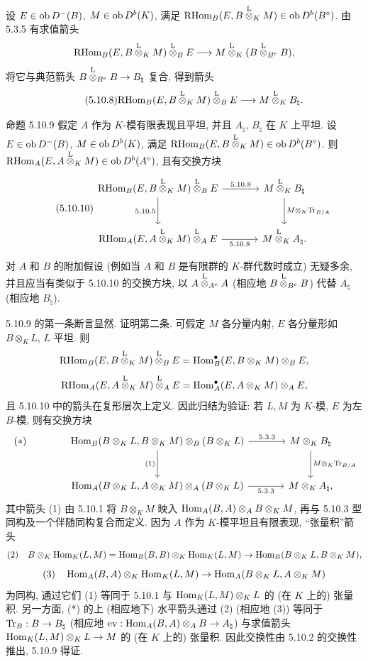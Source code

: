 设 $E\in\operatorname{ob} D^-(B)$, $M\in\operatorname{ob} D^b(K)$, 满足 $\mathrm{RHom}_B(E,B\overset{\mathrm L}{\otimes}_KM)\in\operatorname{ob} D^b(B^\circ)$. 由 5.3.5 有求值箭头
\[
\mathrm{RHom}_B(E,B\overset{\mathrm L}{\otimes}_KM)\overset{\mathrm L}{\otimes}_BE\longrightarrow M\overset{\mathrm L}{\otimes}_K(B\overset{\mathrm L}{\otimes}_{B^e}B),
\]
将它与典范箭头 $B\overset{\mathrm L}{\otimes}_{B^e}B\to B_\natural$ 复合, 得到箭头
\begin{equation}\tag{5.10.8}
\mathrm{RHom}_B(E,B\overset{\mathrm L}{\otimes}_KM)\overset{\mathrm L}{\otimes}_BE\longrightarrow M\overset{\mathrm L}{\otimes}_KB_\natural.
\end{equation}

\begin{statement}{命题 5.10.9}
假定 $A$ 作为 $K$-模有限表现且平坦, 并且 $A_\natural$, $B_\natural$ 在 $K$ 上平坦. 设 $E\in\operatorname{ob} D^-(B)$, $M\in\operatorname{ob} D^b(K)$, 满足 $\mathrm{RHom}_B(E,B\overset{\mathrm L}{\otimes}_KM)\in\operatorname{ob} D^b(B^\circ)$. 则 $\mathrm{RHom}_A(E,A\overset{\mathrm L}{\otimes}_KM)\in\operatorname{ob} D^b(A^\circ)$, 且有交换方块
\begin{equation}\tag{5.10.10}
\begin{tikzcd}[column sep=large,row sep=large]
\RHom_B(E,B\lten_KM)\lten_BE \arrow[r,"5.10.8"] \arrow[d,"5.10.5"'] & M\lten_KB_\natural \arrow[d,"M\otimes_K\Tr_{B/A}"]\\
\RHom_A(E,A\lten_KM)\lten_AE \arrow[r,"5.10.8"'] & M\lten_KA_\natural .
\end{tikzcd}
\end{equation}
\end{statement}

对 $A$ 和 $B$ 的附加假设 (例如当 $A$ 和 $B$ 是有限群的 $K$-群代数时成立) 无疑多余, 并且应当有类似于 5.10.10 的交换方块, 以 $A\overset{\mathrm L}{\otimes}_{A^e}A$ (相应地 $B\overset{\mathrm L}{\otimes}_{B^e}B$) 代替 $A_\natural$ (相应地 $B_\natural$).

5.10.9 的第一条断言显然. 证明第二条. 可假定 $M$ 各分量内射, $E$ 各分量形如 $B\otimes_KL$, $L$ 平坦. 则
\[
\mathrm{RHom}_B(E,B\overset{\mathrm L}{\otimes}_KM)\overset{\mathrm L}{\otimes}_BE=\operatorname{Hom}_B^\bullet(E,B\otimes_KM)\otimes_BE,
\]
\[
\mathrm{RHom}_A(E,A\overset{\mathrm L}{\otimes}_KM)\overset{\mathrm L}{\otimes}_AE=\operatorname{Hom}_A^\bullet(E,A\otimes_KM)\otimes_AE,
\]
且 5.10.10 中的箭头在复形层次上定义. 因此归结为验证: 若 $L,M$ 为 $K$-模, $E$ 为左 $B$-模, 则有交换方块
\[
\begin{tikzcd}[column sep=large,row sep=large]
|[alias=star]| {(*)} & \Hom_B(B\otimes_KL,B\otimes_KM)\otimes_B(B\otimes_KL) \arrow[r,"5.3.3"] \arrow[d,"(1)"'] & M\otimes_KB_\natural \arrow[d,"M\otimes_K\Tr_{B/A}"]\\
& \Hom_A(B\otimes_KL,A\otimes_KM)\otimes_A(B\otimes_KL) \arrow[r,"5.3.3"'] & M\otimes_KA_\natural,
\end{tikzcd}
\]
其中箭头 (1) 由 5.10.1 将 $B\otimes_KM$ 映入 $\operatorname{Hom}_A(B,A)\otimes_AB\otimes_KM$, 再与 5.10.3 型同构及一个伴随同构复合而定义. 因为 $A$ 作为 $K$-模平坦且有限表现, ``张量积''箭头
\[
\text{(2)}\quad B\otimes_K\operatorname{Hom}_K(L,M)=\operatorname{Hom}_B(B,B)\otimes_K\operatorname{Hom}_K(L,M)\to\operatorname{Hom}_B(B\otimes_KL,B\otimes_KM),
\]
\[
\text{(3)}\quad \operatorname{Hom}_A(B,A)\otimes_K\operatorname{Hom}_K(L,M)\to\operatorname{Hom}_A(B\otimes_KL,A\otimes_KM)
\]
为同构, 通过它们 (1) 等同于 5.10.1 与 $\operatorname{Hom}_K(L,M)\otimes_KL$ 的 (在 $K$ 上的) 张量积. 另一方面, (*) 的上 (相应地下) 水平箭头通过 (2) (相应地 (3)) 等同于 $\operatorname{Tr}_B:B\to B_\natural$ (相应地 $\mathrm{ev}:\operatorname{Hom}_A(B,A)\otimes_AB\to A_\natural$) 与求值箭头 $\operatorname{Hom}_K(L,M)\otimes_KL\to M$ 的 (在 $K$ 上的) 张量积. 因此交换性由 5.10.2 的交换性推出, 5.10.9 得证.

